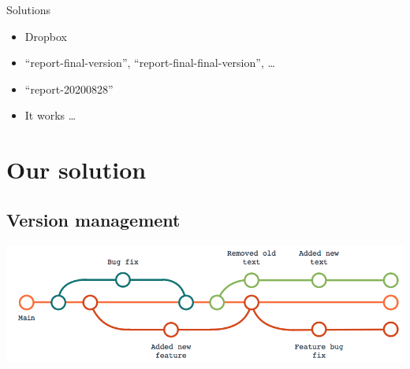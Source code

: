 \begin{frame}
  \begin{alertblock}{Solutions}
    \begin{itemize}
      \item Dropbox
      \item \enquote{report-final-version}, 
        \enquote{report-final-final-version}, \dots
      \item \enquote{report-20200828}
    \end{itemize}
  \end{alertblock}

  \pause

  \begin{remark}
    \begin{itemize}
      \item It works \dots
    \end{itemize}
  \end{remark}
\end{frame}


\section{Our solution}

\subsection{Version management}

\begin{frame}
  \centering
  \includegraphics[width=\columnwidth]{figs/version-tree.png}
\end{frame}

